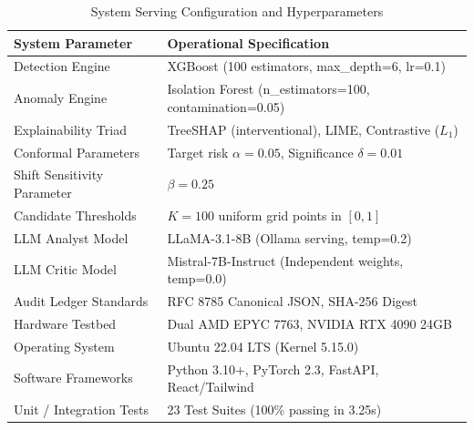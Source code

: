 \documentclass{ieeeaccess}
\begin{document}
\begin{table}[t]
\centering
\caption{System Serving Configuration and Hyperparameters}
\label{tab:training_config}
\begin{tabular}{ll}
\toprule
\textbf{System Parameter} & \textbf{Operational Specification} \\
\midrule
Detection Engine & XGBoost (100 estimators, max\_depth=6, lr=0.1) \\
Anomaly Engine & Isolation Forest (n\_estimators=100, contamination=0.05) \\
Explainability Triad & TreeSHAP (interventional), LIME, Contrastive ($L_1$) \\
Conformal Parameters & Target risk $\alpha = 0.05$, Significance $\delta = 0.01$ \\
Shift Sensitivity Parameter & $\beta = 0.25$ \\
Candidate Thresholds & $K = 100$ uniform grid points in $[0, 1]$ \\
LLM Analyst Model & LLaMA-3.1-8B (Ollama serving, temp=0.2) \\
LLM Critic Model & Mistral-7B-Instruct (Independent weights, temp=0.0) \\
Audit Ledger Standards & RFC 8785 Canonical JSON, SHA-256 Digest \\
Hardware Testbed & Dual AMD EPYC 7763, NVIDIA RTX 4090 24GB \\
Operating System & Ubuntu 22.04 LTS (Kernel 5.15.0) \\
Software Frameworks & Python 3.10+, PyTorch 2.3, FastAPI, React/Tailwind \\
Unit / Integration Tests & 23 Test Suites (100\% passing in 3.25s) \\
\bottomrule
\end{tabular}
\end{table}
\end{document}
